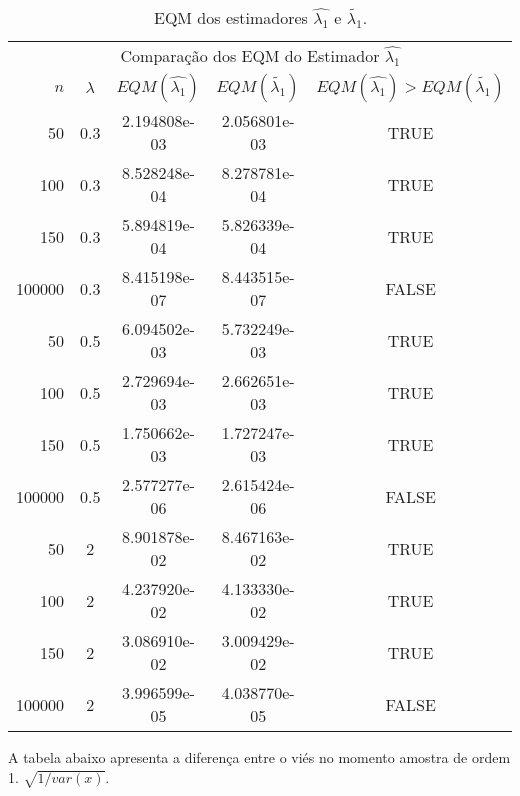 \documentclass[12pt]{article}
\begin{document}
\begin{table}[H]
\caption{EQM dos estimadores $\hat{\lambda_{1}}$ e $\tilde{\lambda_{1}}$.}
\label{tab:p1EQM}
\centering
\begin{tabular}{rcccc}
\toprule
\multicolumn{5}{c}{Comparação dos EQM do Estimador $\hat{\lambda_{1}}$}\\
$n$ & $\lambda$ & $EQM(\hat{\lambda_{1}})$ & $EQM(\tilde{\lambda_{1}})$ & $EQM(\hat{\lambda_{1}})>EQM(\tilde{\lambda_{1}})$ \\
\midrule
50 & 0.3 & 2.194808e-03 & 2.056801e-03  & TRUE \\
100 & 0.3 & 8.528248e-04 & 8.278781e-04 & TRUE \\
150 & 0.3 & 5.894819e-04 & 5.826339e-04 & TRUE \\
100000 & 0.3 & 8.415198e-07 & 8.443515e-07 & FALSE \\
\midrule
50 & 0.5 & 6.094502e-03 & 5.732249e-03  & TRUE \\
100 & 0.5 &  2.729694e-03 & 2.662651e-03 & TRUE \\
150 & 0.5 &  1.750662e-03  & 1.727247e-03 & TRUE\\
100000 & 0.5 & 2.577277e-06 & 2.615424e-06 & FALSE \\
\midrule
50 & 2 & 8.901878e-02 &  8.467163e-02 & TRUE \\
100 & 2 & 4.237920e-02 &  4.133330e-02 & TRUE \\
150 & 2 & 3.086910e-02 & 3.009429e-02 & TRUE \\
100000 & 2 & 3.996599e-05 & 4.038770e-05 & FALSE \\
\bottomrule
\end{tabular}
\end{table}

A tabela abaixo apresenta a diferença entre o viés no momento amostra de ordem 1.  $\sqrt{1/var(x)}$.
\end{document}
